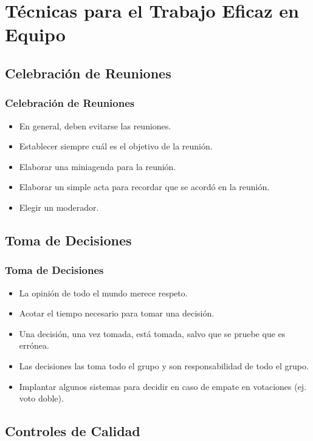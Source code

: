 \documentclass[a4paper,slidestop,xcolor=pst,dvips,blue]{beamer}
\begin{document}
\section{Técnicas para el Trabajo Eficaz en Equipo}

\subsection{Celebración de Reuniones}

\begin{frame}[c]
	\frametitle{Celebración de Reuniones}
	\begin{itemize}[<+->]
		\item En general, deben evitarse las reuniones.
		\item Establecer siempre cuál es el objetivo de la reunión.
		\item Elaborar una miniagenda para la reunión.
		\item Elaborar un simple acta para recordar que se acordó en la reunión.
		\item Elegir un moderador.
	\end{itemize}
\end{frame}

\subsection{Toma de Decisiones}

\begin{frame}[c]
	\frametitle{Toma de Decisiones}
	\begin{itemize}[<+->]
		\item La opinión de todo el mundo merece respeto.
		\item Acotar el tiempo necesario para tomar una decisión.
		\item Una decisión, una vez tomada, está tomada, salvo que se pruebe que es errónea.
		\item Las decisiones las toma todo el grupo y son responsabilidad de todo el grupo.
		\item Implantar algunos sistemas para decidir en caso de empate en votaciones (ej. voto doble).
	\end{itemize}
\end{frame}

\subsection{Controles de Calidad}
\end{document}
